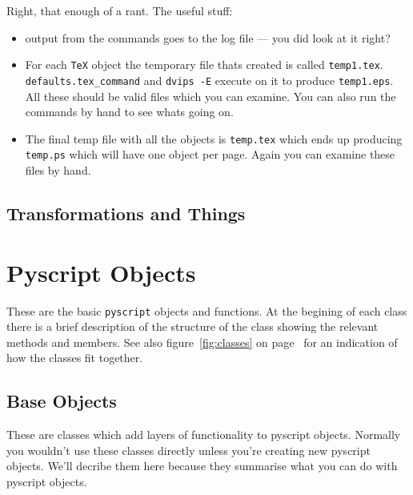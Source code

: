 \documentclass[a4paper]{book}
\begin{document}
Right, that enough of a rant. The useful stuff:
\begin{itemize}
\item output from the commands goes to the log file --- you did look
  at it right?
\item For each \Verb|TeX| object the temporary file thats created is
  called \Verb|temp1.tex|.  \Verb|defaults.tex_command| and
  \Verb|dvips -E| execute on it to produce \Verb|temp1.eps|. All these
  should be valid files which you can examine. You can also run the
  commands by hand to see whats going on.
\item The final temp file with all the objects is \Verb|temp.tex|
  which ends up producing \Verb|temp.ps| which will have one object
  per page. Again you can examine these files by hand.
\end{itemize}

\section{Transformations and Things}


\chapter{Pyscript Objects}
\label{cha:base-objects}

These are the basic \Verb|pyscript| objects and functions. At the
begining of each class there is a brief description of the structure
of the class showing the relevant methods and members. See also
figure~\ref{fig:classes} on page~\pageref{fig:classes} for an
indication of how the classes fit together.

\section{Base Objects}

These are classes which add layers of functionality to pyscript objects.
Normally you wouldn't use these classes directly unless you're creating new 
pyscript objects. We'll decribe them here because they summarise what
you can do with pyscript objects.

\end{document}
